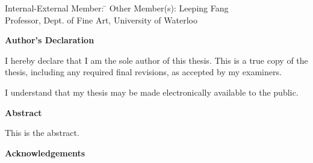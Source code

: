 \documentclass[letterpaper,12pt,titlepage,oneside,final]{book}
\let\origdoublepage\cleardoublepage
\newcommand{\clearemptydoublepage}{%
  \clearpage{\pagestyle{empty}\origdoublepage}}
\let\cleardoublepage\clearemptydoublepage
\begin{document}
  \noindent
\begin{tabbing}
Internal-External Member: \=  \kill %
Other Member(s): \> Leeping Fang \\
\> Professor, Dept. of Fine Art, University of Waterloo \\
\end{tabbing}

\cleardoublepage
{}    %

 \begin{center}\textbf{Author's Declaration}\end{center}

 \noindent
I hereby declare that I am the sole author of this thesis. This is a true copy of the thesis, including any required final revisions, as accepted by my examiners.
 \noindent  
  \bigskip
  
  \noindent
I understand that my thesis may be made electronically available to the public.

\cleardoublepage
{}    %

\begin{center}\textbf{Abstract}\end{center}

This is the abstract.


\cleardoublepage
{}    %

\begin{center}\textbf{Acknowledgements}\end{center}
\end{document}
